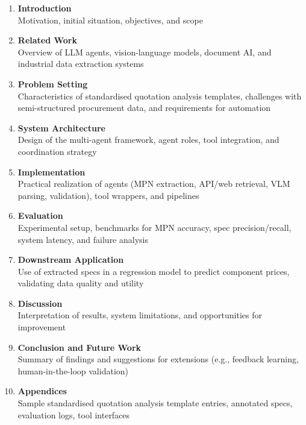 \documentclass[11pt]{article}
\begin{document}
\begin{enumerate}
  \item \textbf{Introduction} \\
  Motivation, initial situation, objectives, and scope

  \item \textbf{Related Work} \\
  Overview of LLM agents, vision-language models, document AI, and industrial data extraction systems

  \item \textbf{Problem Setting} \\
  Characteristics of standardised quotation analysis templates, challenges with semi-structured procurement data, and requirements for automation

  \item \textbf{System Architecture} \\
  Design of the multi-agent framework, agent roles, tool integration, and coordination strategy

  \item \textbf{Implementation} \\
  Practical realization of agents (MPN extraction, API/web retrieval, VLM parsing, validation), tool wrappers, and pipelines

  \item \textbf{Evaluation} \\
  Experimental setup, benchmarks for MPN accuracy, spec precision/recall, system latency, and failure analysis

  \item \textbf{Downstream Application} \\
  Use of extracted specs in a regression model to predict component prices, validating data quality and utility

  \item \textbf{Discussion} \\
  Interpretation of results, system limitations, and opportunities for improvement

  \item \textbf{Conclusion and Future Work} \\
  Summary of findings and suggestions for extensions (e.g., feedback learning, human-in-the-loop validation)

  \item \textbf{Appendices} \\
  Sample standardised quotation analysis template entries, annotated specs, evaluation logs, tool interfaces
\end{enumerate}
\end{document}
